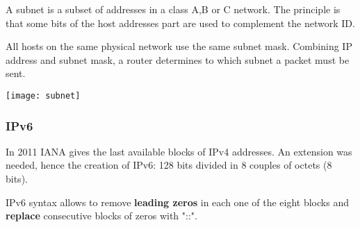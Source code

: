 \begin{definition}[Subnet]
	A subnet is a subset of addresses in a class A,B or C network. The principle is that some bits of the host addresses part are used to complement the network ID.
\end{definition}
All hosts on the same physical network use the same subnet mask. Combining IP address and subnet mask, a router determines to which subnet a packet must be sent.

\begin{center}
	\texttt{[image: subnet]}
\end{center}

\subsubsection{IPv6}
In 2011 IANA gives the last available blocks of IPv4 addresses. An extension was needed, hence the creation of IPv6: 128 bits divided in 8 couples of octets (8 bits).

\begin{note}
	IPv6 syntax allows to remove \textbf{leading zeros} in each one of the eight blocks and \textbf{replace} consecutive blocks of zeros with "::".
\end{note}


